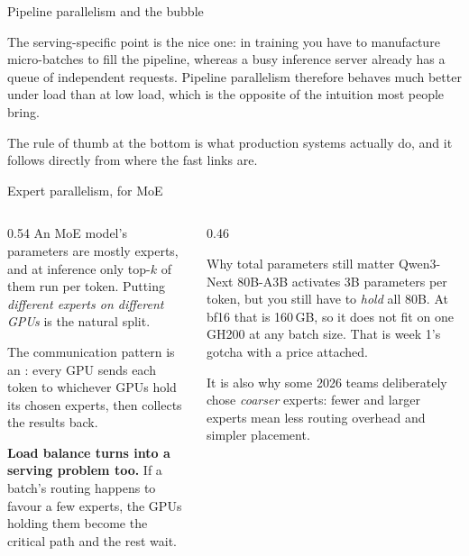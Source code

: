 \documentclass[aspectratio=169,10pt]{beamer}
\begin{document}
\begin{frame}{Pipeline parallelism and the bubble}
{  The serving-specific point is the nice one: in training you have to
  manufacture micro-batches to fill the pipeline, whereas a busy inference
  server already has a queue of independent requests. Pipeline parallelism
  therefore behaves much better under load than at low load, which is the
  opposite of the intuition most people bring.

  The rule of thumb at the bottom is what production systems actually do, and
  it follows directly from where the fast links are.}
\end{frame}

\begin{frame}{Expert parallelism, for MoE}
  \begin{columns}[T]
    \begin{column}{0.54\textwidth}
      An MoE model's parameters are mostly experts, and at inference only
      top-$k$ of them run per token. Putting \emph{different experts on
      different GPUs} is the natural split.
      \vspace{0.5em}

      The communication pattern is an : every GPU sends each
      token to whichever GPUs hold its chosen experts, then collects the
      results back.
      \vspace{0.5em}

      \textbf{Load balance turns into a serving problem too.} If a batch's
      routing happens to favour a few experts, the GPUs holding them become
      the critical path and the rest wait.
    \end{column}
    \begin{column}{0.46\textwidth}
      \begin{block}{Why total parameters still matter}
        \small
        Qwen3-Next 80B-A3B activates 3B parameters per token, but you still
        have to \emph{hold} all 80B. At bf16 that is 160\,GB, so it does not
        fit on one GH200 at any batch size.
        \vspace{0.3em}
         That is week 1's
        gotcha with a price attached.
      \end{block}
      \vspace{0.2em}
      \small
      It is also why some 2026 teams deliberately chose \emph{coarser}
      experts: fewer and larger experts mean less routing overhead and simpler
      placement.
    \end{column}
  \end{columns}
\end{frame}
\end{document}
